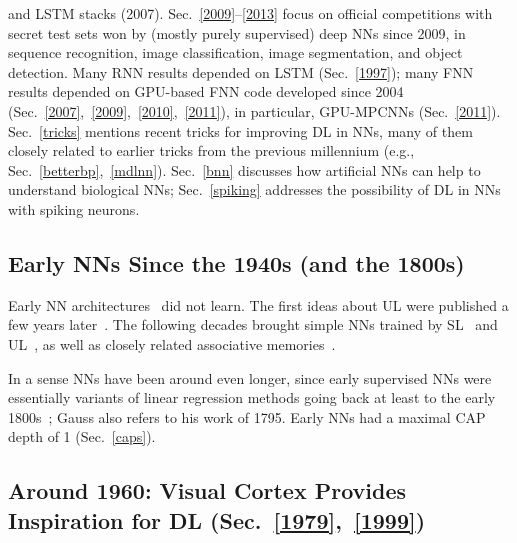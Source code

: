 \documentclass[letterpaper]{article}
\begin{document}
\begin{CJK*}{UTF8}{gbsn}
\begin{sloppypar}
and LSTM stacks (2007).
Sec.~\ref{2009}--\ref{2013} focus on official competitions with secret test sets 
won by (mostly purely supervised) deep NNs since 2009,
in sequence recognition, image classification, image segmentation, and object detection.
Many RNN results depended on LSTM (Sec.~\ref{1997});
many FNN results depended on GPU-based FNN code developed since 2004 (Sec.~\ref{2007},~\ref{2009},~\ref{2010},~\ref{2011}),
in particular, GPU-MPCNNs  (Sec.~\ref{2011}). 
Sec.~\ref{tricks} mentions
recent tricks for improving DL in NNs, many of them closely
related to earlier tricks from the previous millennium (e.g., Sec.~\ref{betterbp},~\ref{mdlnn}).
Sec.~\ref{bnn} discusses how artificial NNs can  help to understand biological NNs;
Sec.~\ref{spiking} addresses the possibility of DL in NNs with spiking neurons.
 





\subsection{Early NNs Since the 1940s (and the 1800s)}
\label{1940}

Early NN architectures~\citep{mcculloch:43} did not learn.
The first ideas about UL were published a few years later~\citep{Hebb:49}.
The following decades brought simple NNs trained by SL~\citep[e.g.,][]{rosenblatt1958,Rosenblatt:62,adaline62,Narendra:74}
and UL~\citep[e.g.,][]{Grossberg69a,kohonen1972,malsburg1973,WillshawMalsburg:76},
as well as closely related associative memories~\citep[e.g.,][]{Palm:80,Hopfield:82}.

In a sense NNs have been around even longer, since
early supervised NNs  were essentially variants of 
linear regression methods going back at least to the early 1800s~\citep[e.g.,][]{legendre1805,gauss1809,gauss1821}; Gauss also refers to his work of 1795.
Early NNs had a maximal CAP depth of 1 (Sec.~\ref{caps}).



\subsection{Around 1960: Visual Cortex Provides Inspiration for DL (Sec.~\ref{1979},~\ref{1999})}
\label{1962}


\end{sloppypar}
\end{CJK*}
\end{document}
